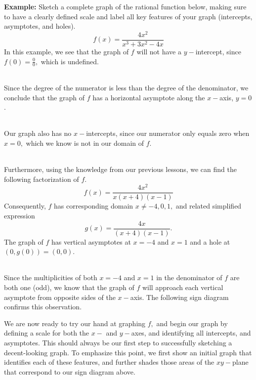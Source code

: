 \documentclass[12pt]{article}
\theoremstyle{definition}
\begin{document}
{\bf Example:} Sketch a complete graph of the rational function below, making sure to have a clearly defined scale and label all key features of your graph (intercepts, asymptotes, and holes).
$$f(x)=\dfrac{4x^2}{x^3+3x^2-4x}$$
In this example, we see that the graph of $f$ will not have a $y-$intercept, since $f(0)=\frac{0}{0},$ which is undefined.\\
\ \par
Since the degree of the numerator is less than the degree of the denominator, we conclude that the graph of $f$ has a horizontal asymptote along the $x-$axis, $y=0$.\\
\ \par
Our graph also has no $x-$intercepts, since our numerator only equals zero when $x=0,$ which we know is not in our domain of $f$.\\
\ \par
Furthermore, using the knowledge from our previous lessons, we can find the following factorization of $f$.
$$f(x)=\dfrac{4x^2}{x(x+4)(x-1)}$$
Consequently, $f$ has corresponding domain $x\neq -4,0,1,$ and related simplified expression
$$g(x)=\dfrac{4x}{(x+4)(x-1)}.$$
The graph of $f$ has vertical asymptotes at $x=-4$ and $x=1$ and a hole at $(0,g(0))=(0,0)$.\\
\ \par
Since the multiplicities of both $x=-4$ and $x=1$ in the denominator of $f$ are both one (odd), we know that the graph of $f$ will approach each vertical asymptote from opposite sides of the $x-$axis.  The following sign diagram confirms this observation.
\begin{center}
\end{center}
We are now ready to try our hand at graphing $f,$ and begin our graph by defining a scale for both the $x-$ and $y-$axes, and identifying all intercepts, and asymptotes.  This should always be our first step to successfully sketching a decent-looking graph.  To emphasize this point, we first show an initial graph that identifies each of these features, and further shades those areas of the $xy-$plane that correspond to our sign diagram above.
\end{document}
